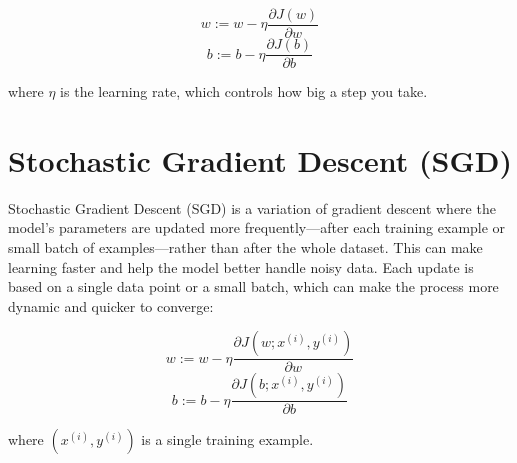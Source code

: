 \[
w := w - \eta \frac{\partial J(w)}{\partial w}
\]
\[
b := b - \eta \frac{\partial J(b)}{\partial b}
\]

where \( \eta \) is the learning rate, which controls how big a step you take.

\section{Stochastic Gradient Descent (SGD)}
Stochastic Gradient Descent (SGD) is a variation of gradient descent where the model’s parameters are updated more frequently—after each training example or small batch of examples—rather than after the whole dataset. This can make learning faster and help the model better handle noisy data. Each update is based on a single data point or a small batch, which can make the process more dynamic and quicker to converge:

\[
w := w - \eta \frac{\partial J(w; x^{(i)}, y^{(i)})}{\partial w}
\]
\[
b := b - \eta \frac{\partial J(b; x^{(i)}, y^{(i)})}{\partial b}
\]

where \( (x^{(i)}, y^{(i)}) \) is a single training example.
